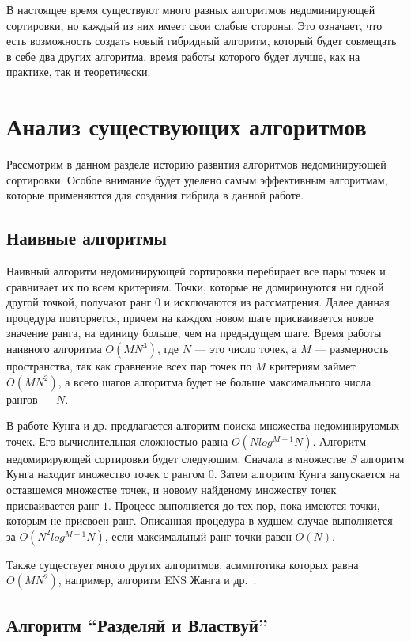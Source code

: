 В настоящее время существуют много разных алгоритмов недоминирующей сортировки, но каждый из них имеет свои слабые стороны. Это означает, что есть возможность создать новый гибридный алгоритм, который будет совмещать в себе два других алгоритма, время работы которого будет лучше, как на практике, так и теоретически.

\section{Анализ существующих алгоритмов}

Рассмотрим в данном разделе историю развития алгоритмов недоминирующей сортировки. Особое внимание будет уделено самым эффективным алгоритмам, которые применяются для создания гибрида в данной работе.

\subsection{Наивные алгоритмы}

Наивный алгоритм недоминирующей сортировки перебирает все пары точек и сравнивает их по всем критериям. Точки, которые не домиринуются ни одной другой точкой, получают ранг $0$ и исключаются из рассматрения. Далее данная процедура повторяется, причем на каждом новом шаге присваивается новое значение ранга, на единицу больше, чем на предыдущем шаге. Время работы наивного алгоритма $O(MN^3)$, где $N$ {---} это число точек, а $M$ {---} размерность пространства, так как сравнение всех пар точек по $M$ критериям займет $O(MN^2)$, а всего шагов алгоритма будет не больше максимального числа рангов {---} $N$.

В работе Кунга и др. \cite{Kung} предлагается алгоритм поиска множества недоминируюмых точек. Его вычислительная сложностью равна $O(N log^{M-1} N)$. Алгоритм недомирирующей сортировки будет следующим. 
Сначала в множестве $S$ алгоритм Кунга находит множество точек с рангом $0$. Затем алгоритм Кунга запускается на оставшемся множестве точек, и новому найденому множеству точек присваивается ранг $1$. Процесс выполняется до тех пор, пока имеются точки, которым не присвоен ранг. Описанная процедура в худшем случае выполняется за $O(N^2 log^{M-1} N)$, если максимальный ранг точки равен $O(N)$.

Также существует много других алгоритмов, асимптотика которых равна $O(MN^2)$, например, алгоритм ENS Жанга и др.~\cite{Zhang}.

\subsection{Алгоритм ``Разделяй и Властвуй''}

